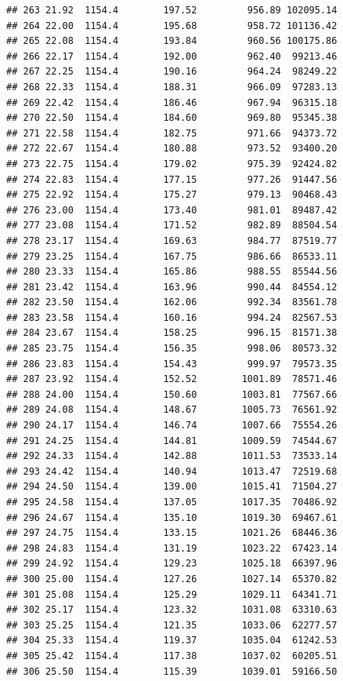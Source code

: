 \documentclass[]{article}
\begin{document}
\begin{verbatim}
## 263 21.92  1154.4        197.52         956.89 102095.14
## 264 22.00  1154.4        195.68         958.72 101136.42
## 265 22.08  1154.4        193.84         960.56 100175.86
## 266 22.17  1154.4        192.00         962.40  99213.46
## 267 22.25  1154.4        190.16         964.24  98249.22
## 268 22.33  1154.4        188.31         966.09  97283.13
## 269 22.42  1154.4        186.46         967.94  96315.18
## 270 22.50  1154.4        184.60         969.80  95345.38
## 271 22.58  1154.4        182.75         971.66  94373.72
## 272 22.67  1154.4        180.88         973.52  93400.20
## 273 22.75  1154.4        179.02         975.39  92424.82
## 274 22.83  1154.4        177.15         977.26  91447.56
## 275 22.92  1154.4        175.27         979.13  90468.43
## 276 23.00  1154.4        173.40         981.01  89487.42
## 277 23.08  1154.4        171.52         982.89  88504.54
## 278 23.17  1154.4        169.63         984.77  87519.77
## 279 23.25  1154.4        167.75         986.66  86533.11
## 280 23.33  1154.4        165.86         988.55  85544.56
## 281 23.42  1154.4        163.96         990.44  84554.12
## 282 23.50  1154.4        162.06         992.34  83561.78
## 283 23.58  1154.4        160.16         994.24  82567.53
## 284 23.67  1154.4        158.25         996.15  81571.38
## 285 23.75  1154.4        156.35         998.06  80573.32
## 286 23.83  1154.4        154.43         999.97  79573.35
## 287 23.92  1154.4        152.52        1001.89  78571.46
## 288 24.00  1154.4        150.60        1003.81  77567.66
## 289 24.08  1154.4        148.67        1005.73  76561.92
## 290 24.17  1154.4        146.74        1007.66  75554.26
## 291 24.25  1154.4        144.81        1009.59  74544.67
## 292 24.33  1154.4        142.88        1011.53  73533.14
## 293 24.42  1154.4        140.94        1013.47  72519.68
## 294 24.50  1154.4        139.00        1015.41  71504.27
## 295 24.58  1154.4        137.05        1017.35  70486.92
## 296 24.67  1154.4        135.10        1019.30  69467.61
## 297 24.75  1154.4        133.15        1021.26  68446.36
## 298 24.83  1154.4        131.19        1023.22  67423.14
## 299 24.92  1154.4        129.23        1025.18  66397.96
## 300 25.00  1154.4        127.26        1027.14  65370.82
## 301 25.08  1154.4        125.29        1029.11  64341.71
## 302 25.17  1154.4        123.32        1031.08  63310.63
## 303 25.25  1154.4        121.35        1033.06  62277.57
## 304 25.33  1154.4        119.37        1035.04  61242.53
## 305 25.42  1154.4        117.38        1037.02  60205.51
## 306 25.50  1154.4        115.39        1039.01  59166.50

\end{verbatim}
\end{document}
